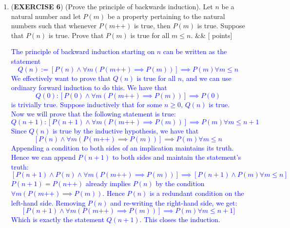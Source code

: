 \documentclass[12pt]{article}
\newcommand{\points}[1]{\hfill {[#1 points]}}
\newcommand{\problem}[2][]{%
  \item {#2}%
  \ifx&#1&%
  \else%
    \points{#1}%
  \fi
  \par\vspace{0.5em}
}
\begin{document}
\begin{enumerate}[leftmargin=*, label=\textbf{\arabic*.}]
	\problem{(\textbf{EXERCISE 6}) (Prove the principle of backwards induction). Let $n$ be a natural number and let $P(m)$ be a property pertaining to the natural numbers such that whenever $P(m\text{++})$ is true, then $P(m)$ is true. Suppose that $P(n)$ is true. Prove that $P(m)$ is true for all $m \leq n$.}
	\textcolor{blue}{The principle of backward induction starting on $n$ can be written as the statement
	\begin{equation}
	Q(n) := [P(n) \land \forall m (P(m\text{++}) \implies P(m))] \implies P(m) \forall m \leq n
	\label{eq:2}
	\end{equation}
	We effectively want to prove that $Q(n)$ is true for all $n$, and we can use ordinary forward induction to do this. We have that $$Q(0) : [P(0) \land \forall m (P(m\text{++}) \implies P(m))] \implies P(0)$$ is trivially true. Suppose inductively that for some $n \geq 0$, $Q(n)$ is true. Now we will prove that the following statement is true: $$Q(n+1) : [P(n+1) \land \forall m (P(m\text{++}) \implies P(m))] \implies P(m) \forall m \leq n+1 $$ Since $Q(n)$ is true by the inductive hypothesis, we have that $$[P(n) \land \forall m (P(m\text{++}) \implies P(m))] \implies P(m) \forall m \leq n$$ Appending a condition to both sides of an implication maintains its truth. Hence we can append $P(n+1)$ to both sides and maintain the statement's truth: $$[P(n+1) \land P(n) \land \forall m (P(m\text{++}) \implies P(m))] \implies [P(n+1) \land P(m) \forall m \leq n]$$  $P(n+1) = P(n\text{++})$ already implies $P(n)$ by the condition $\forall m (P(m\text{++}) \implies P(m))$. Hence $P(n)$ is a redundant condition on the left-hand side. Removing $P(n)$ and re-writing the right-hand side, we get:
	$$[P(n+1)\land \forall m (P(m\text{++}) \implies P(m))] \implies P(m) \forall m \leq n+1]$$
	Which is exactly the statement $Q(n+1)$. This closes the induction.}
	
	
	
\end{enumerate}
\end{document}
